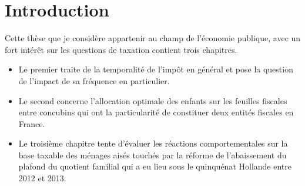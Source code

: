 
\ifx\isEmbedded\undefined





\setcounter{chapter}{0}



\renewcommand*\thesection{\Roman{section}.}
\renewcommand*\thesubsection{\arabic{subsection}.}
\renewcommand*\thesubsubsection{\thesubsection\arabic{subsubsection}}
\setcounter{secnumdepth}{3} 
\setcounter{tocdepth}{3}





\providecommand{\tightlist}{%
  \setlength{\itemsep}{0pt}\setlength{\parskip}{0pt}}


\else \fi

\chapter*{\label{Introduction} Introduction \LARGE  \\ } %










Cette thèse que je considère appartenir au champ de l'économie publique,
avec un fort intérêt sur les questions de taxation contient trois
chapitres.

\begin{itemize}
\item
  Le premier traite de la temporalité de l'impôt en général et pose la
  question de l'impact de sa fréquence en particulier.
\item
  Le second concerne l'allocation optimale des enfants sur les feuilles
  fiscales entre concubins qui ont la particularité de constituer deux
  entités fiscales en France.
\item
  Le troisième chapitre tente d'évaluer les réactions comportementales
  sur la base taxable des ménages aisés touchés par la réforme de
  l'abaissement du plafond du quotient familial qui a eu lieu sous le
  quinquénat Hollande entre 2012 et 2013.
\end{itemize}

